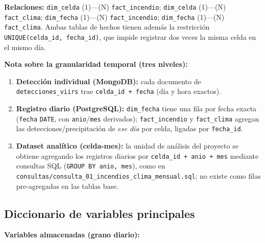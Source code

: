 \documentclass[11pt,a4paper]{article}
\begin{document}
\noindent\textbf{Relaciones:} \texttt{dim\_celda} (1)---(N) \texttt{fact\_incendio}; \texttt{dim\_celda} (1)---(N) \texttt{fact\_clima}; \texttt{dim\_fecha} (1)---(N) \texttt{fact\_incendio}; \texttt{dim\_fecha} (1)---(N) \texttt{fact\_clima}. Ambas tablas de hechos tienen adem\'as la restricci\'on \texttt{UNIQUE(celda\_id, fecha\_id)}, que impide registrar dos veces la misma celda en el mismo d\'ia.

\vspace{0.3cm}
\noindent\textbf{Nota sobre la granularidad temporal (tres niveles):}
\begin{enumerate}
    \item \textbf{Detecci\'on individual (MongoDB):} cada documento de \texttt{detecciones\_viirs} trae \texttt{celda\_id + fecha} (d\'ia y hora exactos).
    \item \textbf{Registro diario (PostgreSQL):} \texttt{dim\_fecha} tiene una fila por fecha exacta (\texttt{fecha} \texttt{DATE}, con \texttt{anio}/\texttt{mes} derivados); \texttt{fact\_incendio} y \texttt{fact\_clima} agregan las detecciones/precipitaci\'on de \emph{ese d\'ia} por celda, ligadas por \texttt{fecha\_id}.
    \item \textbf{Dataset anal\'itico (celda-mes):} la unidad de an\'alisis del proyecto se obtiene agregando los registros diarios por \texttt{celda\_id + anio + mes} mediante consultas SQL (\texttt{GROUP BY anio, mes}), como en \texttt{consultas/consulta\_01\_incendios\_clima\_mensual.sql}; no existe como filas pre-agregadas en las tablas base.
\end{enumerate}

\subsection{Diccionario de variables principales}

\noindent\textbf{Variables almacenadas (grano diario):}
\end{document}
